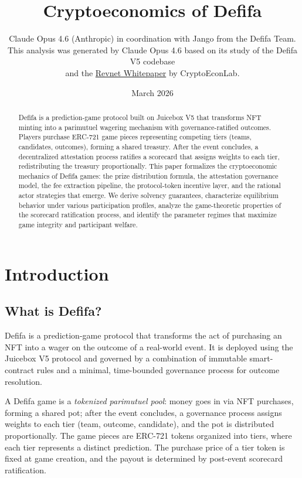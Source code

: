 \documentclass[11pt,a4paper]{article}
\title{\textbf{Cryptoeconomics of Defifa}}
\author{Claude Opus 4.6 (Anthropic) in coordination with Jango from the Defifa Team.\\[4pt]
\small This analysis was generated by Claude Opus 4.6 based on its study of the Defifa V5 codebase\\
\small and the \href{https://cryptoeconlab.com/paper/pub-0?paper=https\%253A\%252F\%252Fstorage.googleapis.com\%252Fcel-public-resources\%252FRevnet-Whitepaper.pdf}{Revnet Whitepaper} by CryptoEconLab.}
\date{March 2026}
\begin{document}
\maketitle

\begin{abstract}
Defifa is a prediction-game protocol built on Juicebox V5 that transforms NFT minting into a parimutuel wagering mechanism with governance-ratified outcomes. Players purchase ERC-721 game pieces representing competing tiers (teams, candidates, outcomes), forming a shared treasury. After the event concludes, a decentralized attestation process ratifies a scorecard that assigns weights to each tier, redistributing the treasury proportionally. This paper formalizes the cryptoeconomic mechanics of Defifa games: the prize distribution formula, the attestation governance model, the fee extraction pipeline, the protocol-token incentive layer, and the rational actor strategies that emerge. We derive solvency guarantees, characterize equilibrium behavior under various participation profiles, analyze the game-theoretic properties of the scorecard ratification process, and identify the parameter regimes that maximize game integrity and participant welfare.
\end{abstract}

\tableofcontents
\newpage

\section{Introduction}

\subsection{What is Defifa?}

Defifa is a prediction-game protocol that transforms the act of purchasing an NFT into a wager on the outcome of a real-world event. It is deployed using the Juicebox V5 protocol and governed by a combination of immutable smart-contract rules and a minimal, time-bounded governance process for outcome resolution.

A Defifa game is a \emph{tokenized parimutuel pool}: money goes in via NFT purchases, forming a shared pot; after the event concludes, a governance process assigns weights to each tier (team, outcome, candidate), and the pot is distributed proportionally. The game pieces are ERC-721 tokens organized into tiers, where each tier represents a distinct prediction. The purchase price of a tier token is fixed at game creation, and the payout is determined by post-event scorecard ratification.
\end{document}
